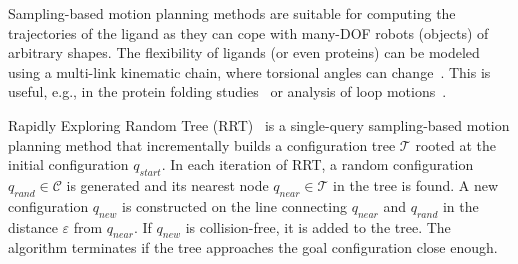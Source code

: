\documentclass{svmult}
\def\qrand{q_{rand}}
\def\qstart{q_{start}}
\def\qinit{\qstart}
\def\qnear{q_{near}}
\def\qnew{q_{new}}
\def\T{\mathcal{T}}
\def\C{\mathcal{C}}
\begin{document}
Sampling-based motion planning methods are suitable for computing the trajectories of the ligand as they 
can cope with many-DOF robots (objects) of arbitrary shapes.
The flexibility of ligands (or even proteins) can be modeled using a multi-link kinematic chain, where torsional angles
can change~\cite{songPFpath}.
This is useful, e.g., in the protein folding studies~\cite{al2012motion,gipson2012computational,amato2002using,raveh2009rapid,novinskaya2015improving,songPFintro} or analysis of loop motions~\cite{cortes2004geometric}.

Rapidly Exploring Random Tree (RRT)~\cite{lavalleRRT} is a single-query sampling-based motion planning method that 
incrementally builds a configuration tree $\T$ rooted at the initial configuration $\qinit$.
In each iteration of RRT, a random configuration $\qrand \in \C$ is generated and its nearest node $\qnear \in \T$ in the tree is found.
A new configuration $\qnew$ is constructed on the line connecting $\qnear$ and $\qrand$ in the distance $\varepsilon$ from $\qnear$.
If $\qnew$ is collision-free, it is added to the tree.
The algorithm terminates if the tree approaches the goal configuration close enough.



\end{document}
